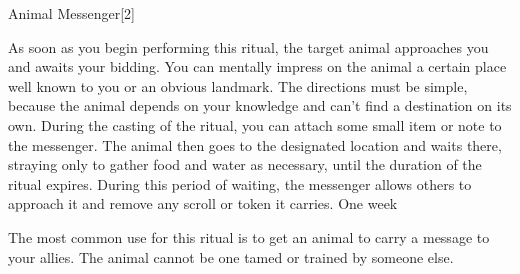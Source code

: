 \begin{spellsection}{Animal Messenger}[2]
    \begin{spellheader}
    \end{spellheader}
    \begin{spellcontent}
        \begin{spelltargetinginfo}
            \spellrng{\rnglong}
        \end{spelltargetinginfo}
        \begin{spelleffects}

            \spelleffect As soon as you begin performing this ritual, the target animal approaches you and awaits your bidding. You can mentally impress on the animal a certain place well known to you or an obvious landmark. The directions must be simple, because the animal depends on your knowledge and can't find a destination on its own. During the casting of the ritual, you can attach some small item or note to the messenger. The animal then goes to the designated location and waits there, straying only to gather food and water as necessary, until the duration of the ritual expires. During this period of waiting, the messenger allows others to approach it and remove any scroll or token it carries.
            \spelldur One week
        \end{spelleffects}
    \end{spellcontent}
    \begin{spellfooter}
        \spellnotes The most common use for this ritual is to get an animal to carry a message to your allies. The animal cannot be one tamed or trained by someone else.
    \end{spellfooter}
\end{spellsection}

